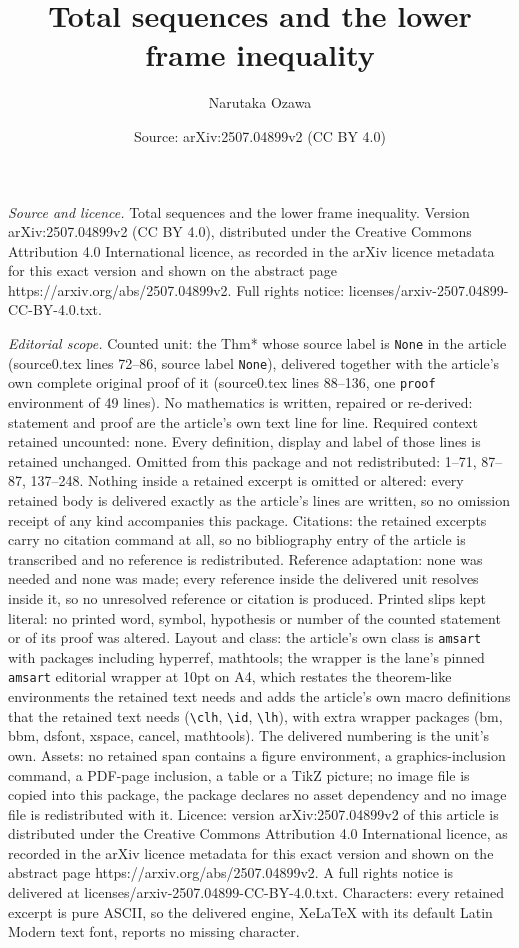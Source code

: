 \documentclass[10pt,a4paper]{amsart}
\title[Total sequences and the lower frame inequality]{Total sequences and the lower frame inequality}
\author{Narutaka Ozawa}
\date{Source: arXiv:2507.04899v2 (CC BY 4.0)}
\begin{document}
\maketitle

\noindent\emph{Source and licence.} Total sequences and the lower frame inequality. Version arXiv:2507.04899v2 (CC BY 4.0), distributed under the Creative Commons Attribution 4.0 International licence, as recorded in the arXiv licence metadata for this exact version and shown on the abstract page https://arxiv.org/abs/2507.04899v2. Full rights notice: licenses/arxiv-2507.04899-CC-BY-4.0.txt.\par\smallskip

\noindent\textit{Editorial scope.} Counted unit: the Thm* whose source label is \texttt{None} in the article (source0.tex lines 72--86, source label \texttt{None}), delivered together with the article's own complete original proof of it (source0.tex lines 88--136, one \texttt{proof} environment of 49 lines). No mathematics is written, repaired or re-derived: statement and proof are the article's own text line for line. Required context retained uncounted: none. Every definition, display and label of those lines is retained unchanged. Omitted from this package and not redistributed: 1--71, 87--87, 137--248. Nothing inside a retained excerpt is omitted or altered: every retained body is delivered exactly as the article's lines are written, so no omission receipt of any kind accompanies this package. Citations: the retained excerpts carry no citation command at all, so no bibliography entry of the article is transcribed and no reference is redistributed. Reference adaptation: none was needed and none was made; every reference inside the delivered unit resolves inside it, so no unresolved reference or citation is produced. Printed slips kept literal: no printed word, symbol, hypothesis or number of the counted statement or of its proof was altered. Layout and class: the article's own class is \texttt{amsart} with packages including hyperref, mathtools; the wrapper is the lane's pinned \texttt{amsart} editorial wrapper at 10pt on A4, which restates the theorem-like environments the retained text needs and adds the article's own macro definitions that the retained text needs (\texttt{\textbackslash clh}, \texttt{\textbackslash id}, \texttt{\textbackslash lh}), with extra wrapper packages (bm, bbm, dsfont, xspace, cancel, mathtools). The delivered numbering is the unit's own. Assets: no retained span contains a figure environment, a graphics-inclusion command, a PDF-page inclusion, a table or a TikZ picture; no image file is copied into this package, the package declares no asset dependency and no image file is redistributed with it. Licence: version arXiv:2507.04899v2 of this article is distributed under the Creative Commons Attribution 4.0 International licence, as recorded in the arXiv licence metadata for this exact version and shown on the abstract page https://arxiv.org/abs/2507.04899v2. A full rights notice is delivered at licenses/arxiv-2507.04899-CC-BY-4.0.txt. Characters: every retained excerpt is pure ASCII, so the delivered engine, XeLaTeX with its default Latin Modern text font, reports no missing character.
\end{document}
